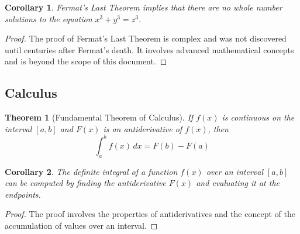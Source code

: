 \documentclass{article}
\newtheorem{theorem}{\textbf{Theorem}}
\newtheorem{corollary}{\textbf{Corollary}}[theorem]
\begin{document}
\begin{corollary}
    Fermat's Last Theorem implies that there are no whole number solutions to the equation \(x^3 + y^3 = z^3\).
\end{corollary}

\begin{proof}
    The proof of Fermat's Last Theorem is complex and was not discovered until centuries after Fermat's death. It involves advanced mathematical concepts and is beyond the scope of this document.
\end{proof}

\subsection{Calculus}

\begin{theorem}[Fundamental Theorem of Calculus]\label{ftc}
    If \(f(x)\) is continuous on the interval \([a, b]\) and \(F(x)\) is an antiderivative of \(f(x)\), then
    \[ \int_{a}^{b} f(x) \,dx = F(b) - F(a) \]
\end{theorem}

\begin{corollary}
    The definite integral of a function \(f(x)\) over an interval \([a, b]\) can be computed by finding the antiderivative \(F(x)\) and evaluating it at the endpoints.
\end{corollary}

\begin{proof}
    The proof involves the properties of antiderivatives and the concept of the accumulation of values over an interval.
\end{proof}
\end{document}
